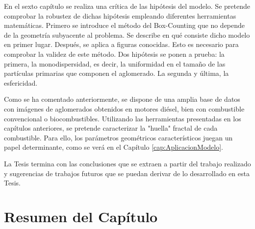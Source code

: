\par En el sexto capítulo se realiza una crítica de las hipótesis del modelo. Se pretende comprobar la robustez de dichas hipótesis empleando diferentes herramientas matemáticas. Primero se introduce el método del Box-Counting que no depende de la geometría subyacente al problema. Se describe en qué consiste dicho modelo en primer lugar. Después, se aplica a figuras conocidas. Esto es necesario para comprobar la validez de este método. Dos hipótesis se ponen a prueba: la primera, la monodispersidad, es decir, la uniformidad en el tamaño de las partículas primarias que componen el aglomerado. La segunda y última, la esfericidad.

\par Como se ha comentado anteriormente, se dispone de una amplia base de datos con imágenes de aglomerados obtenidos en motores diésel, bien con combustible convencional o biocombustibles. Utilizando las herramientas presentadas en los capítulos anteriores, se pretende caracterizar la "huella" fractal de cada combustible. Para ello, los parámetros geométricos característicos juegan un papel determinante, como se verá en el Capítulo \ref{cap:AplicacionModelo}.

\par La Tesis termina con las conclusiones que se extraen a partir del trabajo realizado y sugerencias de trabajos futuros que se puedan derivar de lo desarrollado en esta Tesis.

\section{Resumen del Capítulo}\label{sec:ResumenCapitulo1}

\newpage
	

